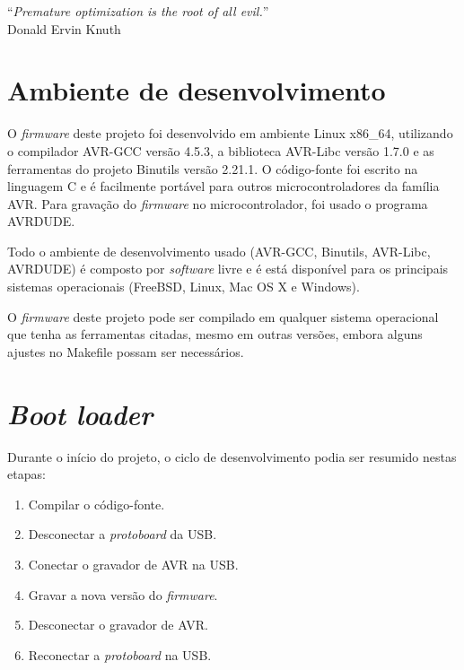\documentclass[brazil,pagestart=firstchapter]{abnt}
\begin{document}
\vfill{}
\begin{flushright}{}
``\emph{Premature optimization is the root of all evil.}''\\
{\small Donald Ervin Knuth}
\end{flushright}{\small \par}
\vfill{}

\newpage


\section{Ambiente de desenvolvimento}
\label{sec:software_ambiente}

O \textit{firmware} deste projeto foi desenvolvido em ambiente Linux x86\_64,
utilizando o compilador AVR-GCC versão 4.5.3, a biblioteca AVR-Libc versão
1.7.0 e as ferramentas do projeto Binutils versão 2.21.1. O código-fonte foi
escrito na linguagem C e é facilmente portável para outros
microcontroladores da família AVR. Para gravação do \textit{firmware} no
microcontrolador, foi usado o programa AVRDUDE.

Todo o ambiente de desenvolvimento usado (AVR-GCC, Binutils, AVR-Libc,
AVRDUDE) é composto por \textit{software} livre e é está disponível para os
principais sistemas operacionais (FreeBSD, Linux, Mac OS X e Windows).
\cite{avrlibcoverview}

O \textit{firmware} deste projeto pode ser compilado em qualquer sistema
operacional que tenha as ferramentas citadas, mesmo em outras versões,
embora alguns ajustes no Makefile possam ser necessários.


\section{\textit{Boot loader}}
\label{sec:bootloader}

Durante o início do projeto, o ciclo de desenvolvimento podia ser resumido
nestas etapas:

\begin{enumerate}
\item Compilar o código-fonte.
\item Desconectar a \textit{protoboard} da \ac{USB}.
\item Conectar o gravador de AVR na \ac{USB}.
\item Gravar a nova versão do \textit{firmware}.
\item Desconectar o gravador de AVR.
\item Reconectar a \textit{protoboard} na \ac{USB}.
\end{enumerate}
\end{document}
